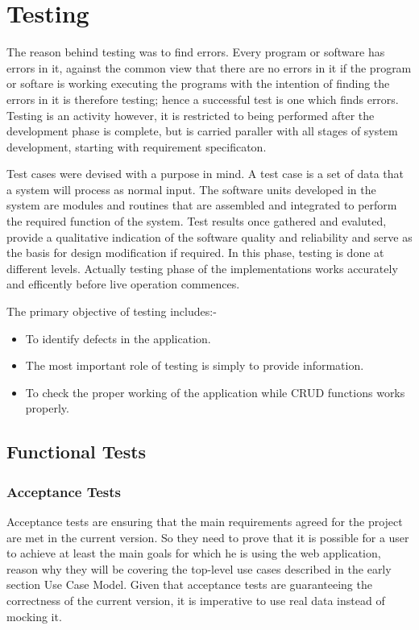 \chapter{Testing}
The reason behind testing was to find errors. Every program or software has errors in it, against the common view that there are no errors in it if the program or softare is working executing the programs with the intention of finding the errors in it is therefore testing; hence a successful test is one which finds errors. Testing is an activity however, it is restricted to being performed after the development phase is complete, but is carried paraller with all stages of system development, starting with requirement specificaton.

Test cases were devised with a purpose in mind. A test case is a set of data that a system will process as normal input. The software units developed in the system are modules and routines that are assembled and integrated to perform the required function of the system. Test results once gathered and evaluted, provide a qualitative indication of the software quality and reliability and serve as the basis for design modification if required. In this phase, testing is done at different levels. Actually testing phase of the implementations works accurately and efficently before live operation commences.

The primary objective of testing includes:-
\begin{itemize}
	\item To identify defects in the application.
	\item The most important role of testing is simply to provide information.
	\item To check the proper working of the application while CRUD functions works properly.
\end{itemize}

  
\section{Functional Tests}

\subsection{Acceptance Tests}

Acceptance tests are ensuring that the main requirements agreed for the project are met in the current version. So they need to prove that it is possible for a user to achieve at least the main goals for which he is using the web application, reason why they will be covering the top-level use cases described in the early section Use Case Model. Given that acceptance tests are guaranteeing the correctness of the current version, it is imperative to use real data instead of mocking it.

